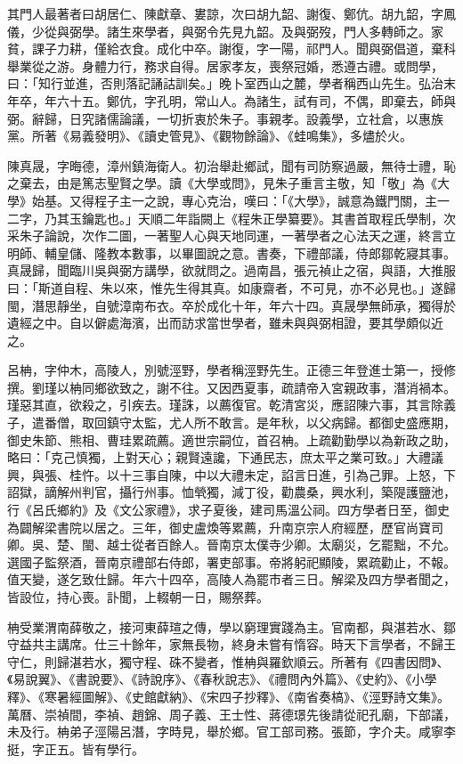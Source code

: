 \begin{pinyinscope}
其門人最著者曰胡居仁、陳獻章、婁諒，次曰胡九韶、謝復、鄭伉。胡九韶，字鳳儀，少從與弼學。諸生來學者，與弼令先見九韶。及與弼歿，門人多轉師之。家貧，課子力耕，僅給衣食。成化中卒。謝復，字一陽，祁門人。聞與弼倡道，棄科舉業從之游。身體力行，務求自得。居家孝友，喪祭冠婚，悉遵古禮。或問學，曰：「知行並進，否則落記誦詁訓矣。」晚卜室西山之麓，學者稱西山先生。弘治末年卒，年六十五。鄭伉，字孔明，常山人。為諸生，試有司，不偶，即棄去，師與弼。辭歸，日究諸儒論議，一切折衷於朱子。事親孝。設義學，立社倉，以惠族黨。所著《易義發明》、《讀史管見》、《觀物餘論》、《蛙鳴集》，多燼於火。

陳真晟，字晦德，漳州鎮海衛人。初治舉赴鄉試，聞有司防察過嚴，無待士禮，恥之棄去，由是篤志聖賢之學。讀《大學或問》，見朱子重言主敬，知「敬」為《大學》始基。又得程子主一之說，專心克治，嘆曰：「《大學》，誠意為鐵門關，主一二字，乃其玉鑰匙也。」天順二年詣闕上《程朱正學纂要》。其書首取程氏學制，次采朱子論說，次作二圖，一著聖人心與天地同運，一著學者之心法天之運，終言立明師、輔皇儲、隆教本數事，以畢圖說之意。書奏，下禮部議，侍郎鄒乾寢其事。真晟歸，聞臨川吳與弼方講學，欲就問之。過南昌，張元禎止之宿，與語，大推服曰：「斯道自程、朱以來，惟先生得其真。如康齋者，不可見，亦不必見也。」遂歸閩，潛思靜坐，自號漳南布衣。卒於成化十年，年六十四。真晟學無師承，獨得於遺經之中。自以僻處海濱，出而訪求當世學者，雖未與與弼相證，要其學頗似近之。

呂柟，字仲木，高陵人，別號涇野，學者稱涇野先生。正德三年登進士第一，授修撰。劉瑾以柟同鄉欲致之，謝不往。又因西夏事，疏請帝入宮親政事，潛消禍本。瑾惡其直，欲殺之，引疾去。瑾誅，以薦復官。乾清宮災，應詔陳六事，其言除義子，遣番僧，取回鎮守太監，尤人所不敢言。是年秋，以父病歸。都御史盛應期，御史朱節、熊相、曹珪累疏薦。適世宗嗣位，首召柟。上疏勸勤學以為新政之助，略曰：「克己慎獨，上對天心；親賢遠讒，下通民志，庶太平之業可致。」大禮議興，與張、桂忤。以十三事自陳，中以大禮未定，諂言日進，引為己罪。上怒，下詔獄，謫解州判官，攝行州事。恤煢獨，減丁役，勸農桑，興水利，築隄護鹽池，行《呂氏鄉約》及《文公家禮》，求子夏後，建司馬溫公祠。四方學者日至，御史為闢解梁書院以居之。三年，御史盧煥等累薦，升南京宗人府經歷，歷官尚寶司卿。吳、楚、閩、越士從者百餘人。晉南京太僕寺少卿。太廟災，乞罷黜，不允。選國子監祭酒，晉南京禮部右侍郎，署吏部事。帝將躬祀顯陵，累疏勸止，不報。值天變，遂乞致仕歸。年六十四卒，高陵人為罷市者三日。解梁及四方學者聞之，皆設位，持心喪。訃聞，上輟朝一日，賜祭葬。

柟受業渭南薛敬之，接河東薛瑄之傳，學以窮理實踐為主。官南都，與湛若水、鄒守益共主講席。仕三十餘年，家無長物，終身未嘗有惰容。時天下言學者，不歸王守仁，則歸湛若水，獨守程、硃不變者，惟柟與羅欽順云。所著有《四書因問》、《易說翼》、《書說要》、《詩說序》、《春秋說志》、《禮問內外篇》、《史約》、《小學釋》、《寒暑經圖解》、《史館獻納》、《宋四子抄釋》、《南省奏槁》、《涇野詩文集》。萬曆、崇禎間，李禎、趙錦、周子義、王士性、蔣德璟先後請從祀孔廟，下部議，未及行。柟弟子涇陽呂潛，字時見，舉於鄉。官工部司務。張節，字介夫。咸寧李挺，字正五。皆有學行。


\end{pinyinscope}
